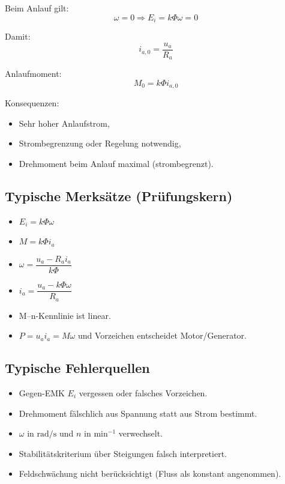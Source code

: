 Beim Anlauf gilt:
\[
\omega=0 \Rightarrow E_i=k\Phi\omega=0
\]

Damit:
\[
\boxed{i_{a,0}=\frac{u_a}{R_a}}
\]

Anlaufmoment:
\[
\boxed{M_0=k\Phi i_{a,0}}
\]

Konsequenzen:
\begin{itemize}
\item Sehr hoher Anlaufstrom,
\item Strombegrenzung oder Regelung notwendig,
\item Drehmoment beim Anlauf maximal (strombegrenzt).
\end{itemize}


\subsection{Typische Merksätze (Prüfungskern)}

\begin{itemize}
    \item $E_i = k\Phi \omega$
    \item $M = k\Phi i_a$
    \item $\omega = \dfrac{u_a - R_a i_a}{k\Phi}$
    \item $i_a = \dfrac{u_a - k\Phi \omega}{R_a}$
    \item M--n-Kennlinie ist linear.
    \item $P=u_a i_a = M\omega$ und Vorzeichen entscheidet Motor/Generator.
\end{itemize}

\subsection{Typische Fehlerquellen}

\begin{itemize}
    \item Gegen-EMK $E_i$ vergessen oder falsches Vorzeichen.
    \item Drehmoment fälschlich aus Spannung statt aus Strom bestimmt.
    \item $\omega$ in $\mathrm{rad/s}$ und $n$ in $\mathrm{min^{-1}}$ verwechselt.
    \item Stabilitätskriterium über Steigungen falsch interpretiert.
    \item Feldschwächung nicht berücksichtigt (Fluss als konstant angenommen).
\end{itemize}

